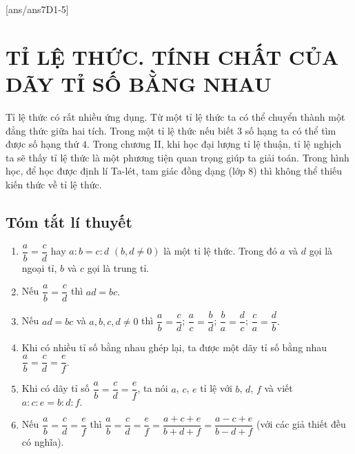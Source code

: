 [ans/ans7D1-5]
\section{TỈ LỆ THỨC. TÍNH CHẤT CỦA DÃY TỈ SỐ BẰNG NHAU}
	Tỉ lệ thức có rất nhiều ứng dụng. Từ một tỉ lệ thức ta có thể chuyển thành một đẳng thức giữa hai tích. Trong một tỉ lệ thức nếu biết $3$ số hạng ta có thể tìm được số hạng thứ $4$. Trong chương II, khi học đại lượng tỉ lệ thuận, tỉ lệ nghịch ta sẽ thấy tỉ lệ thức là một phương tiện quan trọng giúp ta giải toán. Trong hình học, để học được định lí Ta-lét, tam giác đồng dạng (lớp 8) thì không thể thiếu kiến thức về tỉ lệ thức.
\subsection{Tóm tắt lí thuyết}
	\begin{enumerate}[\tickEX]
		\item $\dfrac{a}{b}=\dfrac{c}{d}$ hay $a:b=c:d$ $(b, d \ne 0)$ là một tỉ lệ thức. Trong đó $a$ và $d$ gọi là ngoại tỉ, $b$ và $c$ gọi là trung tỉ.
		\item Nếu $\dfrac{a}{b}=\dfrac{c}{d}$ thì $ad=bc.$
		\item Nếu $ad=bc$ và $a, b, c, d \ne 0$ thì $\dfrac{a}{b}=\dfrac{c}{d}$; $\dfrac{a}{c}=\dfrac{b}{d}$; $\dfrac{b}{a}=\dfrac{d}{c}$; $\dfrac{c}{a}=\dfrac{d}{b}.$
		\item Khi có nhiều tỉ số bằng nhau ghép lại, ta được một dãy tỉ số bằng nhau $\dfrac{a}{b}=\dfrac{c}{d}=\dfrac{e}{f}.$
		\item Khi có dãy tỉ số $\dfrac{a}{b}=\dfrac{c}{d}=\dfrac{e}{f}$, ta nói $a$, $c$, $e$ tỉ lệ với $b$, $d$, $f$ và viết $a:c:e=b:d:f.$
		\item Nếu $\dfrac{a}{b}=\dfrac{c}{d}=\dfrac{e}{f}$ thì $\dfrac{a}{b}=\dfrac{c}{d}=\dfrac{e}{f}=\dfrac{a+c+e}{b+d+f}=\dfrac{a-c+e}{b-d+f}$ (với các giả thiết đều có nghĩa).
	\end{enumerate}
